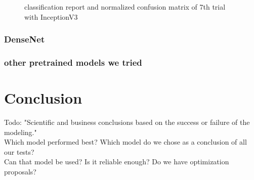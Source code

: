 \documentclass{article}
\begin{document}
\begin{figure}%
  \centering
  \qquad
  \caption{classification report and normalized confusion matrix of 7th trial with InceptionV3}
  \label{fig:inceptionv3_10_results}
\end{figure}

\subsubsection{DenseNet}


\subsubsection{other pretrained models we tried}


\section{Conclusion}
Todo: "Scientific and business conclusions based on the success or failure of the modeling." \\

Which model performed best? Which model do we chose as a conclusion of all our tests? \\
Can that model be used? Is it reliable enough? Do we have optimization proposals? \\
\end{document}
